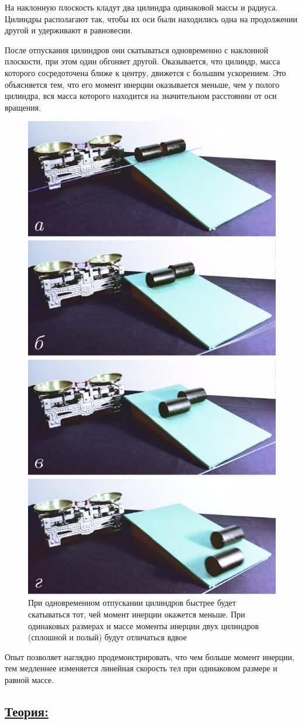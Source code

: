 \documentclass[14pt,a4paper,oneside]{extarticle}	%
\begin{document}
	На наклонную плоскость кладут два цилиндра одинаковой массы и радиуса.
	Цилиндры располагают так, чтобы их оси были находились одна на продолжении другой и удерживают в равновесии.
	
	После отпускания цилиндров они скатываться одновременно с наклонной плоскости, при этом один обгоняет другой. Оказывается, что цилиндр, масса которого сосредоточена ближе к центру, движется с большим ускорением. Это объясняется тем, что его момент инерции оказывается меньше, чем у полого цилиндра, вся масса которого находится на значительном расстоянии от оси вращения.
	
			\begin{figure}[H] 	
		\centering 	
		\includegraphics[width=0.5\linewidth]{inclinedplane-2.png}
		\caption{При одновременном отпускании цилиндров быстрее будет скатываться тот, чей момент инерции окажется меньше. При одинаковых размерах и массе моменты инерции двух цилиндров (сплошной и полый) будут отличаться вдвое}
		\label{inclinedplane-2}
	\end{figure}

	Опыт позволяет наглядно продемонстрировать, что чем больше момент инерции, тем медленнее изменяется линейная скорость тел при одинаковом размере и равной массе.
	
	\newpage	
	\subsection*{\underline{Теория:}}
	
\end{document}
